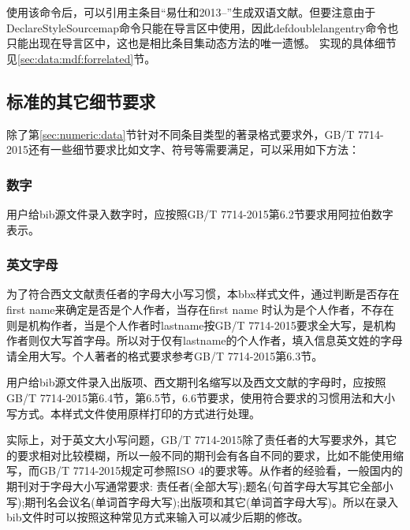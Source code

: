 使用该命令后，可以引用主条目“易仕和2013--”生成双语文献。但要注意由于DeclareStyleSourcemap命令只能在导言区中使用，因此defdoublelangentry命令也只能出现在导言区中，这也是相比条目集动态方法的唯一遗憾。
实现的具体细节见\ref{sec:data:mdf:forrelated}节。

\subsection{标准的其它细节要求}

除了第\ref{sec:numeric:data}节针对不同条目类型的著录格式要求外，GB/T 7714-2015还有一些细节要求比如文字、符号等需要满足，可以采用如下方法：

\subsubsection{数字}\label{sec:fmt:number}

\begin{property}{}{}
用户给bib源文件录入数字时，应按照GB/T 7714-2015第6.2节要求用阿拉伯数字表示。
\end{property}

\subsubsection{英文字母}\label{sec:fmt:lettercase}

\begin{property}{}{}
为了符合西文文献责任者的字母大小写习惯，本bbx样式文件，通过判断是否存在first name来确定是否是个人作者，当存在first name 时认为是个人作者，不存在则是机构作者，当是个人作者时lastname按GB/T 7714-2015要求全大写，是机构作者则仅大写首字母。所以对于仅有lastname的个人作者，填入信息英文姓的字母请全用大写。个人著者的格式要求参考GB/T 7714-2015第6.3节。

用户给bib源文件录入出版项、西文期刊名缩写以及西文文献的字母时，应按照GB/T 7714-2015第6.4节，第6.5节，6.6节要求，使用符合要求的习惯用法和大小写方式。本样式文件使用原样打印的方式进行处理。

实际上，对于英文大小写问题，GB/T 7714-2015除了责任者的大写要求外，其它的要求相对比较模糊，所以一般不同的期刊会有各自不同的要求，比如不能使用缩写，而GB/T 7714-2015规定可参照ISO 4的要求等。从作者的经验看，一般国内的期刊对于字母大小写通常要求:
责任者(全部大写);题名(句首字母大写其它全部小写);期刊名会议名(单词首字母大写);出版项和其它(单词首字母大写)。所以在录入bib文件时可以按照这种常见方式来输入可以减少后期的修改。
\end{property}


